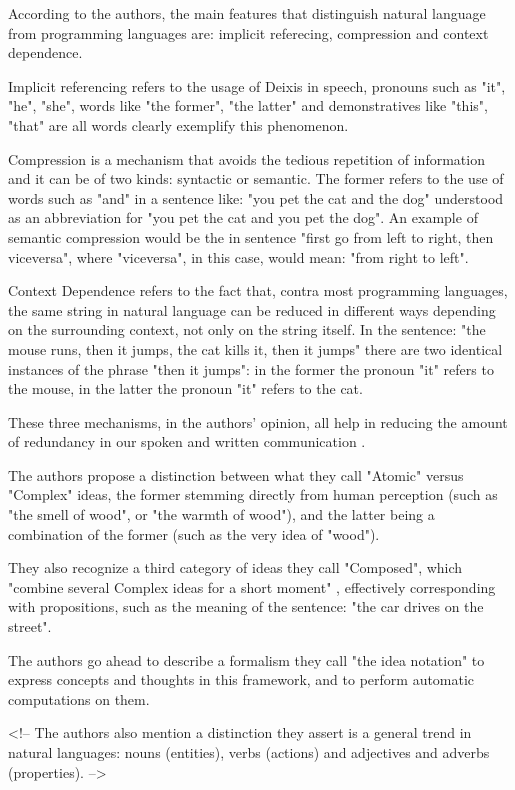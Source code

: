 According to the authors, the main features that distinguish natural language from programming languages are: implicit referecing, compression and context dependence.

Implicit referencing refers to the usage of Deixis in speech, pronouns such as "it", "he", "she", words like "the former", "the latter" and demonstratives like "this", "that" are all words clearly exemplify this phenomenon. 

Compression is a mechanism that avoids the tedious repetition of information and it can be of two kinds: syntactic or semantic. The former refers to the use of words such as "and" in a sentence like: "you pet the cat and the dog" understood as an abbreviation for "you pet the cat and you pet the dog". An example of semantic compression would be the in sentence "first go from left to right, then viceversa", where "viceversa", in this case, would mean: "from right to left".

Context Dependence refers to the fact that, contra most programming languages, the same string in natural language can be reduced in different ways depending on the surrounding context, not only on the string itself. In the sentence: "the mouse runs, then it jumps, the cat kills it, then it jumps" there are two identical instances of the phrase "then it jumps": in the former the pronoun "it" refers to the mouse, in the latter the pronoun "it" refers to the cat.

These three mechanisms, in the authors' opinion, all help in reducing the amount of redundancy in our spoken and written communication \cite{knoll2006pegasus}.

The authors propose a distinction between what they call "Atomic" versus "Complex" ideas, the former stemming directly from human perception (such as "the smell of wood", or "the warmth of wood"), and the latter being a combination of the former (such as the very idea of "wood").

They also recognize a third category of ideas they call "Composed", which "combine several Complex ideas for a short moment" \cite{knoll2006pegasus}, effectively corresponding with propositions, such as the meaning of the sentence: "the car drives on the street".

The authors go ahead to describe a formalism they call "the idea notation" to express concepts and thoughts in this framework, and to perform automatic computations on them.

<!-- The authors also mention a distinction they assert is a general trend in natural languages: nouns (entities), verbs (actions) and adjectives and adverbs (properties). -->

